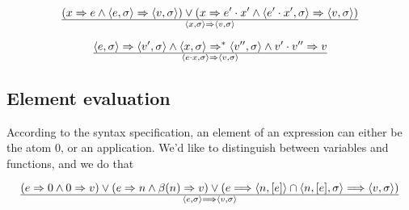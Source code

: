\begin{equation}
{
\left(
    x\Rightarrow e
  \wedge
    \left\langle e,\sigma\right\rangle
    \Rightarrow
    \left\langle v,\sigma\right\rangle
\right)
\vee
\left(
    x\Rightarrow e'\cdot x'
  \wedge
    \left\langle e'\cdot x',\sigma\right\rangle
    \Rightarrow
    \left\langle v,\sigma\right\rangle
\right)
}\over{
  \left\langle x,\sigma\right\rangle
  \Rightarrow
  \left\langle v,\sigma\right\rangle
}
\end{equation}

\begin{equation}
{
  \left\langle e,\sigma\right\rangle
  \Rightarrow
  \left\langle v',\sigma\right\rangle
\wedge
  \left\langle x,\sigma\right\rangle
  \Rightarrow^*
  \left\langle v'',\sigma\right\rangle
\wedge
  v'\cdot v'' \Rightarrow v
}\over{
\left\langle e\cdot x, \sigma\right\rangle
\Rightarrow
\left\langle v,\sigma\right\rangle
}
\end{equation}

\subsection{Element evaluation}

According to the syntax specification, an element of an expression can either
be the atom $0$, or an application. We'd like to distinguish between variables
and functions, and we do that  

\begin{equation}
{
\left(
    e\Rightarrow 0
  \wedge
    0\Rightarrow v
\right)
\vee
\left(
    e\Rightarrow n
  \wedge
    \beta(n)\Rightarrow v
\right)
\vee
\left(e\Longrightarrow \left\langle n, [e]\right\rangle\cap \left\langle
n,[e],\sigma\right\rangle \Longrightarrow \left\langle v,
\sigma\right\rangle\right)
}\over{
\left\langle e,\sigma\right\rangle
\Longrightarrow
\left\langle v,\sigma\right\rangle
}
\end{equation}
